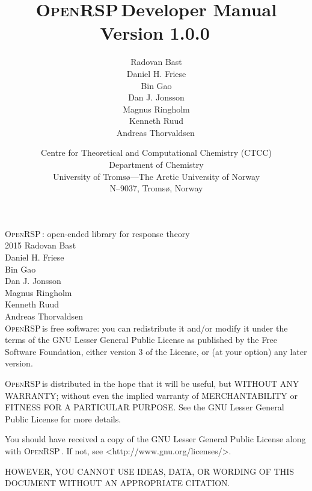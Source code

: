 \documentclass{article}
\begin{document}
\def\LibName{\textsc{OpenRSP}\,}
\def\LibVersion{1.0.0\,}
\def\LibAuthor{Radovan Bast\\
               Daniel H. Friese\\
               Bin Gao\\
               Dan J. Jonsson\\
               Magnus Ringholm\\
               Kenneth Ruud\\
               Andreas Thorvaldsen\,}

\title{\LibName Developer Manual\\
       Version \LibVersion}

\author{\LibAuthor}

\date{Centre for Theoretical and Computational Chemistry (CTCC)\\
      Department of Chemistry\\
      University of Troms{\o}---The Arctic University of Norway\\
      N--9037, Troms{\o}, Norway}

\maketitle
\thispagestyle{empty}

\clearpage

\begingroup
\setlength{\parindent}{0pt}
\setlength{\parskip}{\baselineskip}
\LibName: open-ended library for response theory\\
\textcopyright{} 2015 \LibAuthor\\

\LibName is free software: you can redistribute it and/or modify
it under the terms of the GNU Lesser General Public License as
published by the Free Software Foundation, either version 3 of
the License, or (at your option) any later version.

\LibName is distributed in the hope that it will be useful,
but WITHOUT ANY WARRANTY; without even the implied warranty of
MERCHANTABILITY or FITNESS FOR A PARTICULAR PURPOSE. See the
GNU Lesser General Public License for more details.

You should have received a copy of the GNU Lesser General Public
License along with \LibName. If not, see
<http://www.gnu.org/licenses/>.

HOWEVER, YOU CANNOT USE IDEAS, DATA, OR WORDING OF THIS DOCUMENT
WITHOUT AN APPROPRIATE CITATION.
\endgroup
\end{document}
